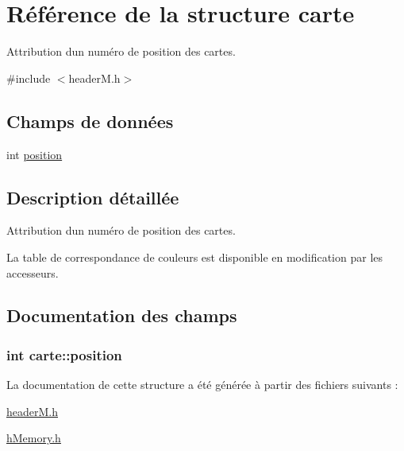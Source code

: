 \hypertarget{structcarte}{}\section{Référence de la structure carte}
\label{structcarte}


Attribution d\textquotesingle{}un numéro de position des cartes.  




{\ttfamily \#include $<$header\+M.\+h$>$}

\subsection*{Champs de données}
\begin{DoxyCompactItemize}
\item 
int \hyperlink{structcarte_af7699a2c1ec1516fc4f0a337e655338c}{position}
\end{DoxyCompactItemize}


\subsection{Description détaillée}
Attribution d\textquotesingle{}un numéro de position des cartes. 

La table de correspondance de couleurs est disponible en modification par les accesseurs. 

\subsection{Documentation des champs}
\subsubsection[{\texorpdfstring{position}{position}}]{\setlength{\rightskip}{0pt plus 5cm}int carte\+::position}\hypertarget{structcarte_af7699a2c1ec1516fc4f0a337e655338c}{}\label{structcarte_af7699a2c1ec1516fc4f0a337e655338c}


La documentation de cette structure a été générée à partir des fichiers suivants \+:\begin{DoxyCompactItemize}
\item 
\hyperlink{header_m_8h}{header\+M.\+h}\item 
\hyperlink{h_memory_8h}{h\+Memory.\+h}\end{DoxyCompactItemize}
